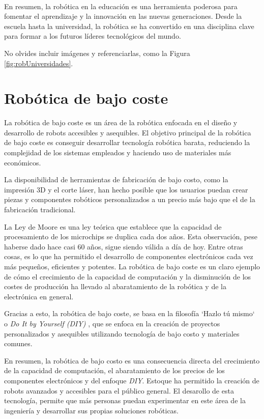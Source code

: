 \\En resumen, la robótica en la educación es una herramienta poderosa para fomentar el aprendizaje y la innovación en las nuevas 
generaciones. Desde la escuela hasta la universidad, la robótica se ha convertido en una disciplina clave para formar a los futuros 
líderes tecnológicos del mundo.

No olvides incluir imágenes y referenciarlas, como la Figura \ref{fig:robUniversidades}.

\section{Robótica de bajo coste}
\label{sec:segundaseccion}
La robótica de bajo coste es un área de la robótica enfocada en el diseño y desarrollo de robots 
accesibles y asequibles. El objetivo principal de la robótica de bajo coste es conseguir desarrollar tecnología robótica
barata, reduciendo la complejidad de los sistemas empleados y haciendo uso de materiales más económicos.

La disponibilidad de herramientas de fabricación de bajo costo, como la impresión 3D y el corte láser, 
han hecho posible que los usuarios puedan crear piezas y componentes robóticos personalizados a un 
precio más bajo que el de la fabricación tradicional.

La Ley de Moore es una ley teórica que establece que la capacidad de procesamiento de los microchips se duplica 
cada dos años. Esta observación, pese haberse dado hace casi 60 años, sigue siendo válida a día de hoy. Entre 
otras cosas, es lo que ha permitido el desarrollo de componentes electrónicos cada vez más pequeños, eficientes 
y potentes. La robótica de bajo coste es un claro ejemplo de cómo el crecimiento de la capacidad de computación y 
la disminución de los costes de producción ha llevado al abaratamiento de la robótica y de la electrónica en general.

Gracias a esto, la robótica de bajo coste, se basa en la filosofía `Hazlo tú mismo` o \textit{Do It by Yourself (DIY)} , que se enfoca en la creación de proyectos personalizados y 
asequibles utilizando tecnología de bajo costo y materiales comunes.

En resumen, la robótica de bajo costo es una consecuencia directa del crecimiento de la capacidad de computación, 
el abaratamiento de los precios de los componentes electrónicos y del enfoque \textit{DIY}. Estoque ha permitido la creación 
de robots avanzados y accesibles para el público general.
El desarollo de esta tecnología, permite que más personas puedan experimentar en este área de la ingeniería y desarrollar 
sus propias soluciones robóticas. 
 
